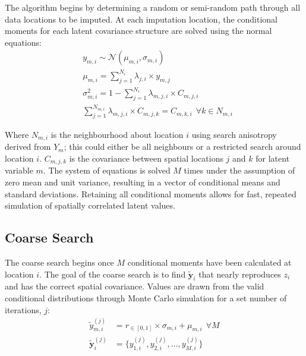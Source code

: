 The algorithm begins by determining a random or semi-random path through all data locations to be imputed. At each imputation location, the conditional moments for each latent covariance structure are solved using the normal equations:
\begin{align}
     & y_{m,i} \sim {\mathcal {N}}\left( \mu_{m,i}, \sigma_{m,i} \right)                           \\
     & \mu_{m,i} = \sum_{j=1}^{N_{i}} \lambda_{j,i} \times y_{m,j}                                 \\
     & \sigma_{m,i}^{2} = 1 - \sum_{j=1}^{N_{i}} \lambda_{m,j,i} \times C_{m,j,i}                  \\
     & \sum_{j=1}^{N_{m,i}} \lambda_{m,j,i} \times C_{m,j,k} = C_{m,k,i} \ \ \forall k \in N_{m,i}
\end{align}

Where $N_{m,i}$ is the neighbourhood about location $i$ using search anisotropy derived from $Y_{m}$; this could either be all neighbours or a restricted search around location $i$. $C_{m,j,k}$ is the covariance between spatial locations $j$ and $k$ for latent variable $m$. The system of equations is solved $M$ times under the assumption of zero mean and unit variance, resulting in a vector of conditional means and standard deviations. Retaining all conditional moments allows for fast, repeated simulation of spatially correlated latent values.

\subsection{Coarse Search}
\label{subsec:coarse}

The coarse search begins once $M$ conditional moments have been calculated at location $i$. The goal of the coarse search is to find $\tilde{\mathbf{y}}_{i}$ that nearly reproduces $z_{i}$ and has the correct spatial covariance. Values are drawn from the valid conditional distributions through Monte Carlo simulation for a set number of iterations, $j$:
\begin{align}
    \tilde{y}_{m, i}^{(j)}       & = r_{\in[0,1]} \times \sigma_{m,i} + \mu_{m,i} \ \ \forall M \\
    \tilde{\mathbf{y}}_{i}^{(j)} & = \{ y_{1, i}^{(j)}, y_{2, i}^{(j)}, \dots, y_{M, i}^{(j)}\}
\end{align}

